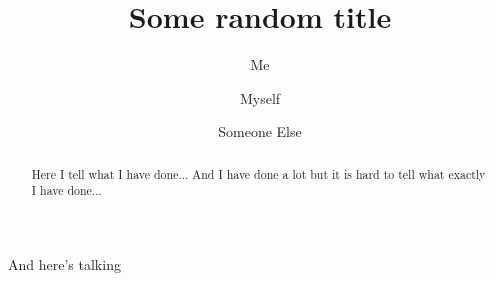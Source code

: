 \documentclass[aps,prl,reprint]{revtex4-1}
\begin{document}
\title{Some random title}
\author{Me}
\author{Myself}
\author{Someone Else}

\begin{abstract}
Here I tell what I have done... And I have done a lot but it is hard to tell what exactly I have done...
\end{abstract}

\maketitle

\blindtext \cite{article-minimal}
And here's talking
\end{document}

